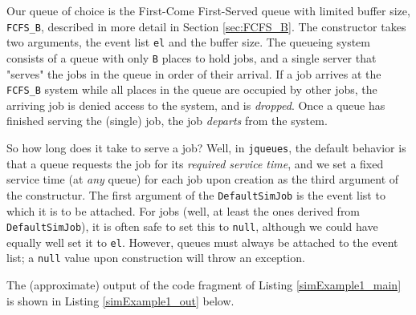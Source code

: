 \documentclass[12pt]{book}
\begin{document}
Our queue of choice is the First-Come First-Served queue
  with limited buffer size, \lstinline|FCFS_B|,
  described in more detail in Section \ref{sec:FCFS_B}.
The constructor takes two arguments,
  the event list \lstinline|el|
  and the buffer size.
The queueing system consists of a queue with only \lstinline|B|
  places to hold jobs,
  and a single server that "serves" the jobs in the queue in order
  of their arrival.
If a job arrives at the \lstinline|FCFS_B| system
  while all places in the queue are occupied by other jobs,
  the arriving job is denied access to the system,
  and is {\em dropped}.
Once a queue has finished serving the (single) job,
  the job {\em departs\/} from the system.

So how long does it take to serve a job?
Well, in \lstinline|jqueues|,
  the default behavior is that
  a queue requests the job for its
  {\em required service time},
  and we set a fixed service time (at {\em any\/} queue)
  for each job upon creation as the third argument of the constructur.
The first argument of the \lstinline-DefaultSimJob-
  is the event list to which it is to be attached.
For jobs (well, at least the ones derived from \lstinline|DefaultSimJob|),
  it is often safe to set this to \lstinline|null|,
  although we could have equally well set it to \lstinline|el|.
However, queues must always be attached to the event list;
  a \lstinline|null| value upon construction will throw an exception.

The (approximate) output of the code fragment of Listing \ref{simExample1_main}
is shown in Listing \ref{simExample1_out} below.
\end{document}
